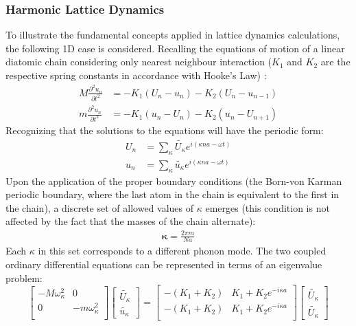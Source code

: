 \subsubsection{Harmonic Lattice Dynamics}
To illustrate the fundamental concepts applied in lattice dynamics calculations, the following 1D case is considered. Recalling the equations of motion of a linear diatomic chain considering only nearest neighbour interaction ($K_1$ and $K_2$ are the respective spring constants in accordance with Hooke's Law) \cite{dove_introduction_1993-3}:
%
\begin{align}
	M\frac{\partial ^2 u_n}{\partial t^2}&=-K_1(U_n-u_n)-K_2(U_n-u_{n-1})\\
	m\frac{\partial ^2 u_n}{\partial t^2}&=-K_1(u_n-U_n)-K_2(u_n-U_{n+1})
\end{align}
%
Recognizing that the solutions to the equations will have the periodic form:
%
\begin{align}
	U_n&=\sum_\kappa \tilde{U_\kappa}e^{i(\kappa na-\omega t)}\\
	u_n&=\sum_\kappa \tilde{u_\kappa}e^{i(\kappa na-\omega t)}
\end{align}
%
Upon the application of the proper boundary conditions (the Born-von Karman periodic boundary, where the last atom in the chain is equivalent to the first in the chain), a discrete set of allowed values of $\kappa$ emerges (this condition is not affected by the fact that the masses of the chain alternate):
%
\begin{align}
	\pmb{\kappa}=\frac{2\pi m}{Na}
\end{align}
%
Each $\kappa$ in this set corresponds to a different phonon mode. The two coupled ordinary differential equations can be represented in terms of an eigenvalue problem:
%
\begin{equation}
\begin{bmatrix}
  -M\omega_\kappa^2 & 0\\
  0 & -m\omega_\kappa^2\\ 
 \end{bmatrix}
\begin{bmatrix}
\tilde{U_\kappa} \\ 
\tilde{u_\kappa}
\end{bmatrix}
=
\begin{bmatrix}
  -(K_1+K_2) & K_1+K_2e^{-i\kappa a}\\
  -(K_1+K_2) & K_1+K_2e^{-i\kappa a}\\ 
 \end{bmatrix}
\begin{bmatrix}
\tilde{U_\kappa} \\ \tilde{U_\kappa}
\end{bmatrix}
\end{equation}
